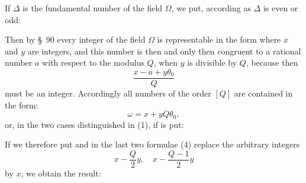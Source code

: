 

If $\Delta$ is the fundamental number of the field $\Omega$, we put, according as $\Delta$ is even or odd:

Then by \S\ 90 every integer of the field $\Omega$ is representable in the form
where $x$ and $y$ are integers, and this number is then and only then congruent to a rational number $a$ with respect to the modulus $Q$, when $y$ is divisible by $Q$, because then
\[
\frac{x - a + y\theta_0}{Q}
\]
must be an integer. Accordingly all numbers of the order $[Q]$ are contained in the form:
\[
\omega = x + yQ\theta_0,
\]
or, in the two cases distinguished in (1), if
is put:

If we therefore put
and in the last two formulae (4) replace the arbitrary integers
\[
x - \frac{Q}{2}y, \quad x - \frac{Q-1}{2}y
\]
by $x$, we obtain the result:
